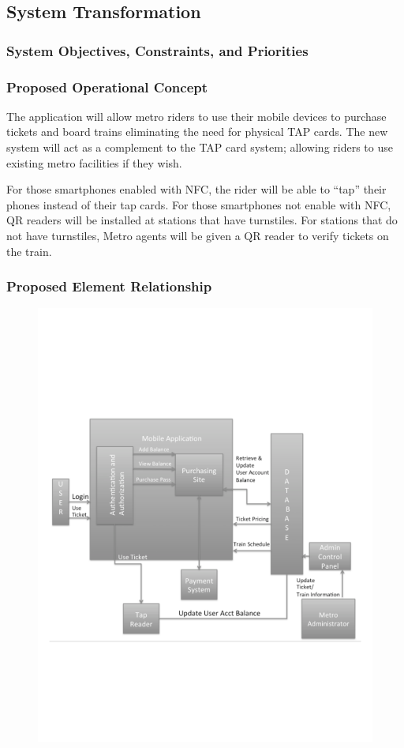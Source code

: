 \subsection{System Transformation}
	\subsubsection{System Objectives, Constraints, and Priorities}
		
	\newpage
	
	\subsubsection{Proposed Operational Concept}
		The application will allow metro riders to use their mobile devices to purchase tickets and board trains eliminating the need for physical TAP cards. The new system will act as a complement to the TAP card system; allowing riders to use existing metro facilities if they wish.
		
		For those smartphones enabled with NFC, the rider will be able to “tap” their phones instead of their tap cards. For those smartphones not enable with NFC, QR readers will be installed at stations that have turnstiles. For stations that do not have turnstiles, Metro agents will be given a QR reader to verify tickets on the train.

	\subsubsection{Proposed Element Relationship}
		\begin{figure}[h]
			\centering
				\includegraphics[scale=0.45]{OCD/er2.pdf}
		\end{figure}			
	\newpage
